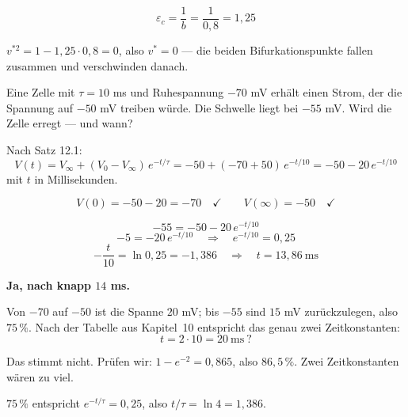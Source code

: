 \begin{aufgabe}
\[ \varepsilon_c = \frac{1}{b} = \frac{1}{0{,}8} = 1{,}25 \]

 $v^{*2} = 1 - 1{,}25\cdot0{,}8 = 0$, also $v^{*} = 0$ --- die beiden Bifurkationspunkte fallen zusammen und verschwinden danach. \checkmark
\end{aufgabe}

\begin{aufgabe}
Eine Zelle mit $\tau = 10$ ms und Ruhespannung $-70$ mV erhält einen Strom, der die Spannung auf $-50$ mV treiben würde. Die Schwelle liegt bei $-55$ mV. Wird die Zelle erregt --- und wann?

\loesung
{}
Nach Satz 12.1:
\[ V(t) = V_\infty + (V_0-V_\infty)\,e^{-t/\tau} = -50 + (-70+50)\,e^{-t/10} = -50 - 20\,e^{-t/10} \]
mit $t$ in Millisekunden.

\[ V(0) = -50 - 20 = -70 \quad \checkmark \qquad V(\infty) = -50 \quad \checkmark \]

\[ -55 = -50 - 20\,e^{-t/10} \]
\[ -5 = -20\,e^{-t/10} \quad\Longrightarrow\quad e^{-t/10} = 0{,}25 \]
\[ -\frac{t}{10} = \ln 0{,}25 = -1{,}386 \quad\Longrightarrow\quad t = 13{,}86\ \mathrm{ms} \]

\textbf{Ja, nach knapp $14$ ms.}

Von $-70$ auf $-50$ ist die Spanne $20$ mV; bis $-55$ sind $15$ mV zurückzulegen, also $75\,\%$. Nach der Tabelle aus Kapitel~10 entspricht das genau zwei Zeitkonstanten:
\[ t = 2 \cdot 10 = 20\ \mathrm{ms}\ ? \]

Das stimmt nicht. Prüfen wir: $1 - e^{-2} = 0{,}865$, also $86{,}5\,\%$. Zwei Zeitkonstanten wären zu viel.

 $75\,\%$ entspricht $e^{-t/\tau} = 0{,}25$, also $t/\tau = \ln 4 = 1{,}386$. \checkmark

\begin{center}
\begin{minipage}{0.86\textwidth}
\end{minipage}
\end{center}


\end{aufgabe}
